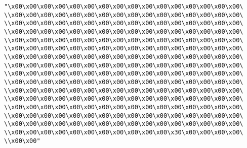 \verb|"\x00\x00\x00\x00\x00\x00\x00\x00\x00\x00\x00\x00\x00\x00\x00\x00\|\newline
\verb|\\x00\x00\x00\x00\x00\x00\x00\x00\x00\x00\x00\x00\x00\x00\x00\x00\|\newline
\verb|\\x00\x00\x00\x00\x00\x00\x00\x00\x00\x00\x00\x00\x00\x00\x00\x00\|\newline
\verb|\\x00\x00\x00\x00\x00\x00\x00\x00\x00\x00\x00\x00\x00\x00\x00\x00\|\newline
\verb|\\x00\x00\x00\x00\x00\x00\x00\x00\x00\x00\x00\x00\x00\x00\x00\x00\|\newline
\verb|\\x00\x00\x00\x00\x00\x00\x00\x00\x00\x00\x00\x00\x00\x00\x00\x00\|\newline
\verb|\\x00\x00\x00\x00\x00\x00\x00\x00\x00\x00\x00\x00\x00\x00\x00\x00\|\newline
\verb|\\x00\x00\x00\x00\x00\x00\x00\x00\x00\x00\x00\x00\x00\x00\x00\x00\|\newline
\verb|\\x00\x00\x00\x00\x00\x00\x00\x00\x00\x00\x00\x00\x00\x00\x00\x00\|\newline
\verb|\\x00\x00\x00\x00\x00\x00\x00\x00\x00\x00\x00\x00\x00\x00\x00\x00\|\newline
\verb|\\x00\x00\x00\x00\x00\x00\x00\x00\x00\x00\x00\x00\x00\x00\x00\x00\|\newline
\verb|\\x00\x00\x00\x00\x00\x00\x00\x00\x00\x00\x00\x00\x00\x00\x00\x00\|\newline
\verb|\\x00\x00\x00\x00\x00\x00\x00\x00\x00\x00\x00\x00\x00\x00\x00\x00\|\newline
\verb|\\x00\x00\x00\x00\x00\x00\x00\x00\x00\x00\x00\x00\x00\x00\x00\x00\|\newline
\verb|\\x00\x00\x00\x00\x00\x00\x00\x00\x00\x00\x00\x00\x00\x00\x00\x00\|\newline
\verb|\\x00\x00\x00\x00\x00\x00\x00\x00\x00\x00\x00\x30\x00\x00\x00\x00\|\newline
\verb|\\x00\x00"|\newline
